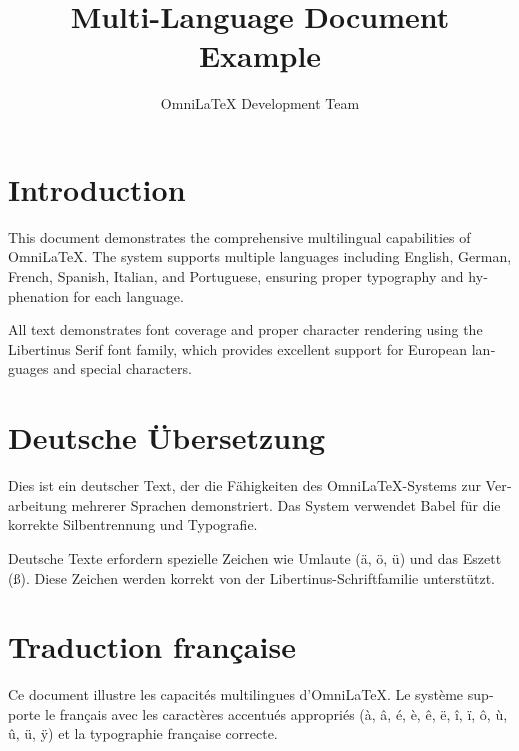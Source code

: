 \documentclass[
    language=english,
    doctype=article,
    institution=none,
]{../../omnilatex}
\title{\foreignlanguage{english}{Multi-Language Document Example}}
\author{\foreignlanguage{english}{OmniLaTeX Development Team}}
\begin{document}

\maketitle

\tableofcontents

\section{\foreignlanguage{english}{Introduction}}

\foreignlanguage{english}{
    This document demonstrates the comprehensive multilingual capabilities of OmniLaTeX.
    The system supports multiple languages including English, German, French, Spanish,
    Italian, and Portuguese, ensuring proper typography and hyphenation for each language.
}

\foreignlanguage{english}{
    All text demonstrates font coverage and proper character rendering using the
    Libertinus Serif font family, which provides excellent support for European
    languages and special characters.
}

\section{\foreignlanguage{ngerman}{Deutsche Übersetzung}}

\foreignlanguage{ngerman}{
    Dies ist ein deutscher Text, der die Fähigkeiten des OmniLaTeX-Systems zur
    Verarbeitung mehrerer Sprachen demonstriert. Das System verwendet Babel für
    die korrekte Silbentrennung und Typografie.
}

\foreignlanguage{ngerman}{
    Deutsche Texte erfordern spezielle Zeichen wie Umlaute (ä, ö, ü) und das Eszett (ß).
    Diese Zeichen werden korrekt von der Libertinus-Schriftfamilie unterstützt.
}

\section{\foreignlanguage{french}{Traduction française}}

\foreignlanguage{french}{
    Ce document illustre les capacités multilingues d'OmniLaTeX. Le système
    supporte le français avec les caractères accentués appropriés (à, â, é, è, ê, ë,
    î, ï, ô, ù, û, ü, ÿ) et la typographie française correcte.
}
\end{document}
